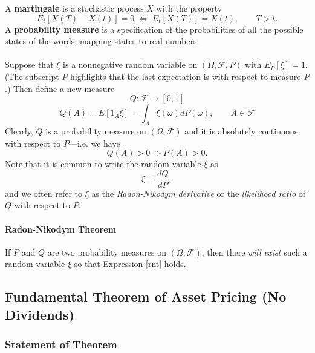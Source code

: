 \documentclass[a4paper,12pt]{scrartcl}
\begin{document}
A \textbf{martingale} is a stochastic process
$X$ with the property 
   \[ E_t[X(T) - X(t)] = 0 \; \Leftrightarrow \; E_t[X(T)] = X(t), \qquad
      T > t. \]
A \textbf{probability measure} is a specification
of the probabilities of all the possible states of the words, mapping
states to real numbers.
\\
\\
Suppose that $\xi$ is a nonnegative random variable on $(\Omega,
\mathcal{F}, P)$ with $E_P[\xi] = 1$. (The subscript $P$ highlights that
the last expectation is with respect to measure $P$.) 
Then define a new measure
   \[ Q: \mathcal{F} \rightarrow [0,1] \]
\begin{equation}
   \label{rnt}
   Q(A) = E\left[1_A \xi\right]=\int_A\xi(\omega) dP(\omega), \qquad
      A\in \mathcal{F} 
\end{equation}
Clearly, $Q$ is a probability measure on $(\Omega, \mathcal{F})$ and
it is absolutely continuous with respect to $P$---i.e. we have
   \[Q(A) > 0 \Rightarrow P(A) > 0.\] 
Note that it is common to write the random variable $\xi$ as
   \[ \xi = \frac{dQ}{dP},\]
and we often refer to $\xi$ as the \emph{Radon-Nikodym derivative}
or the \emph{likelihood ratio} of $Q$ with respect to $P$.

\paragraph{Radon-Nikodym Theorem} If $P$ and $Q$ are two probability
measures on $(\Omega, \mathcal{F})$, then there \emph{will exist}
such a random variable $\xi$ so that Expression \ref{rnt} holds.


\newpage
\subsection{Fundamental Theorem of Asset Pricing (No Dividends)}

\subsubsection{Statement of Theorem}
\end{document}
